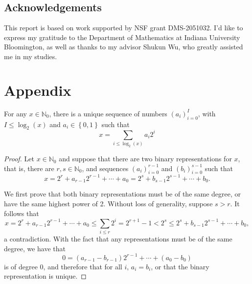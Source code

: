 \documentclass[12pt,reqno]{amsart}
\begin{document}

\subsection*{Acknowledgements}
This report is based on work supported by NSF grant DMS-2051032. I'd like to express my gratitude to the Department of Mathematics at Indiana University Bloomington, as well as thanks to my advisor Shukun Wu, who greatly assisted me in my studies.




\section*{Appendix}

\begin{theorem*}
For any \(x \in \mathbb{N}_{0}  \), there is a unique sequence of numbers \(\left( a_{i}  \right) _{i = 0} ^{I} \), with
\(I \leq \log _{2} \left( x \right) \) and \(a_{i} \in \left\{ 0,1 \right\} \) such that
\[
    x = \sum _{i \leq \log _{2} \left( x \right) } a_{i} 2^{i}
\]
\end{theorem*}

\begin{proof}
Let \(x \in \mathbb{N}_{0}  \) and suppose that there are two binary representations for \(x\),
that is, there are \(r,s \in \mathbb{N}_{0}  \), and sequences \((a_{i} )_{i = 0} ^{r-1}\) and \(\left( b_{i}  \right) _{i = 0} ^{s - 1}\)
such that
\[
    x = 2^{r} + a_{r-1}2^{r-1} + \cdots + a_{0} = 2^{s} + b_{s - 1} 2^{s - 1} + \cdots + b_0  
.\]

We first prove that both binary representations must be of the same degree, or have
the same highest power of 2. Without loss of generality, suppose \(s > r\). It follows that
\[
    x = 2^{r} + a_{r-1} 2^{r-1} + \cdots + a_0 \leq \sum _{i \leq r} 2^{i} = 2^{r+1} - 1 < 2^{s} \leq 2^{s} + b_{s-1} 2^{s-1} + \cdots  + b_0
,\]
a contradiction. With the fact that any representations must be of the same degree,
we have that
\[
    0 = \left( a_{r-1} - b_{r-1}  \right) 2^{r-1} + \cdots + \left( a_0-b_0 \right)
\]
is of degree 0, and therefore that for all \(i\), \(a_{i} = b_{i} \), or that
the binary representation is unique.

\end{proof}
\end{document}
